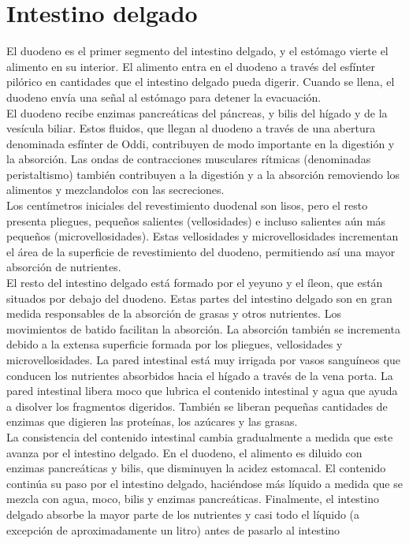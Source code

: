 \section{Intestino delgado}
El duodeno es el primer segmento del intestino delgado, y el estómago vierte el alimento en su interior. El alimento entra en el duodeno a través del esfínter pilórico en 
cantidades que el intestino delgado pueda digerir. Cuando se llena, el duodeno envía una señal al estómago para detener la evacuación.\\
El duodeno recibe enzimas pancreáticas del páncreas, y bilis del hígado y de la vesícula biliar. Estos fluidos, que llegan al duodeno a través de una abertura denominada 
esfínter de Oddi, contribuyen de modo importante en la digestión y la absorción. Las ondas de contracciones musculares rítmicas (denominadas peristaltismo) también contribuyen 
a la digestión y a la absorción removiendo los alimentos y mezclandolos con las secreciones.\\
Los centímetros iniciales del revestimiento duodenal son lisos, pero el resto presenta pliegues, pequeños salientes (vellosidades) e incluso salientes aún más pequeños 
(microvellosidades). Estas vellosidades y microvellosidades incrementan el área de la superficie de revestimiento del duodeno, permitiendo así una mayor absorción de nutrientes.\\
El resto del intestino delgado está formado por el yeyuno y el íleon, que están situados por debajo del duodeno. Estas partes del intestino delgado son en gran medida responsables 
de la absorción de grasas y otros nutrientes. Los movimientos de batido facilitan la absorción. La absorción también se incrementa debido a la extensa superficie formada por los 
pliegues, vellosidades y microvellosidades. La pared intestinal está muy irrigada por vasos sanguíneos que conducen los nutrientes absorbidos hacia el hígado a través de la vena 
porta. La pared intestinal libera moco que lubrica el contenido intestinal y agua que ayuda a disolver los fragmentos digeridos. También se liberan pequeñas cantidades de enzimas 
que digieren las proteínas, los azúcares y las grasas.\\
La consistencia del contenido intestinal cambia gradualmente a medida que este avanza por el intestino delgado. En el duodeno, el alimento es diluido con enzimas pancreáticas 
y bilis, que disminuyen la acidez estomacal. El contenido continúa su paso por el intestino delgado, haciéndose más líquido a medida que se mezcla con agua, moco, bilis y enzimas 
pancreáticas. Finalmente, el intestino delgado absorbe la mayor parte de los nutrientes y casi todo el líquido (a excepción de aproximadamente un litro) antes de pasarlo al intestino 
